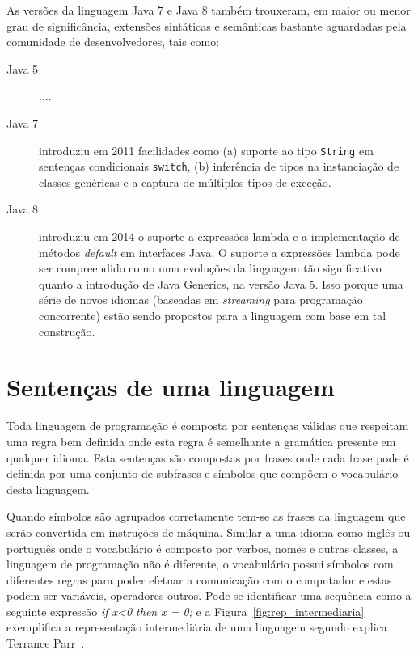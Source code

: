 As versões da linguagem Java 7 e Java 8 também trouxeram, 
em maior ou menor grau de significância, extensões sintáticas 
e semânticas bastante aguardadas pela comunidade de 
desenvolvedores, tais como:

\begin{description}
\item[Java 5] ....

\item[Java 7] introduziu em 2011 facilidades como (a) suporte ao tipo \texttt{String} 
em sentenças condicionais \texttt{switch}, (b) inferência de tipos 
na instanciação de classes genéricas e a captura de 
múltiplos tipos de exceção. 

\item[Java 8] introduziu em 2014 o suporte a expressões lambda e a implementação de 
métodos \emph{default} em interfaces Java. O suporte a expressões lambda pode 
ser compreendido como uma evoluções da linguagem tão significativo 
quanto a introdução de Java Generics, na versão Java 5. Isso porque 
uma série de novos idiomas (baseadas em \emph{streaming} para programação 
concorrente) estão sendo propostos para a linguagem com base em tal construção.   
\end{description} 

\section{Sentenças de uma linguagem}
Toda linguagem de programação é composta por sentenças válidas que respeitam uma regra bem definida onde esta regra é semelhante a gramática presente em qualquer idioma. Esta sentenças são compostas por frases onde cada frase pode é definida por uma conjunto de subfrases e símbolos que compõem o vocabulário desta linguagem. 

Quando símbolos são agrupados corretamente tem-se as frases da linguagem que serão convertida em instruções de máquina. Similar a uma idioma como inglês ou português onde o vocabulário é composto por verbos, nomes e outras classes, a linguagem de programação não é diferente, o vocabulário possui símbolos com diferentes regras para poder efetuar a comunicação com o computador e estas podem ser variáveis, operadores outros. Pode-se identificar uma sequência como a seguinte expressão \textit{if x<0 then x = 0;} e a Figura~\ref{fig:rep_intermediaria} exemplifica a representação intermediária de uma linguagem segundo explica Terrance Parr~\cite{Parr:2009:LIP:1823613}.

